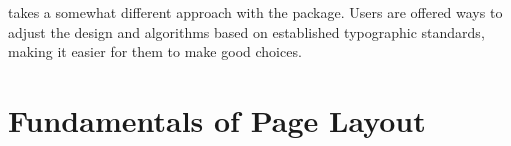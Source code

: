 \KOMAScript{} takes a somewhat different approach with the 
package. Users are offered ways to adjust the design and algorithms based on
established typographic standards, making it easier for them to make good
choices.

\iffalse%
  Note that the \Package{typearea} package makes use of the \Package{scrbase}
  package. The latter is explained in the expert section of this
  \iffree{guide}{book} in \autoref{cha:scrbase} on \autopageref{cha:scrbase}.
  However, most of the features documented there are directed not to users but
  to class and package authors.
\fi

\section{Fundamentals of Page Layout}

